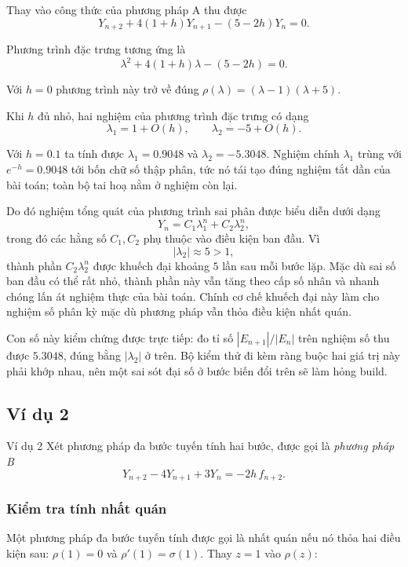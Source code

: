 Thay vào công thức của phương pháp A thu được
\[
Y_{n+2}+4(1+h)Y_{n+1}-(5-2h)Y_n=0.
\]

Phương trình đặc trưng tương ứng là
\[
\lambda^2+4(1+h)\lambda-(5-2h)=0.
\]

Với $h=0$ phương trình này trở về đúng $\rho(\lambda)=(\lambda-1)(\lambda+5)$.

Khi $h$ đủ nhỏ, hai nghiệm của phương trình đặc trưng có dạng
\[
\lambda_1=1+O(h),\qquad
\lambda_2=-5+O(h).
\]

Với $h=0.1$ ta tính được $\lambda_1=0.9048$ và $\lambda_2=-5.3048$. Nghiệm chính
$\lambda_1$ trùng với $e^{-h}=0.9048$ tới bốn chữ số thập phân, tức nó tái tạo đúng
nghiệm tắt dần của bài toán; toàn bộ tai hoạ nằm ở nghiệm còn lại.

Do đó nghiệm tổng quát của phương trình sai phân được biểu diễn dưới dạng
\[
Y_n=C_1\lambda_1^n+C_2\lambda_2^n,
\]
trong đó các hằng số $C_1,C_2$ phụ thuộc vào điều kiện ban đầu. Vì
\[
|\lambda_2|\approx5>1,
\]
thành phần $C_2\lambda_2^n$ được khuếch đại khoảng $5$ lần sau mỗi bước lặp. Mặc dù sai số ban đầu có thể rất nhỏ, thành phần này vẫn tăng theo cấp số nhân và nhanh chóng lấn át nghiệm thực của bài toán. Chính cơ chế khuếch đại này làm cho nghiệm số phân kỳ mặc dù phương pháp vẫn thỏa điều kiện nhất quán.

Con số này kiểm chứng được trực tiếp: đo tỉ số $|E_{n+1}|/|E_n|$ trên nghiệm số thu
được $5.3048$, đúng bằng $|\lambda_2|$ ở trên. Bộ kiểm thử đi kèm ràng buộc hai giá
trị này phải khớp nhau, nên một sai sót đại số ở bước biến đổi trên sẽ làm hỏng build.

\subsection{Ví dụ 2}
\begin{vidu}{Ví dụ 2}
    Xét phương pháp đa bước tuyến tính hai bước, được gọi là \emph{phương pháp B}
    \begin{equation*}
        Y_{n+2}-4Y_{n+1}+3Y_n=-2h\,f_{n+2}.
    \end{equation*}
\end{vidu}


\subsubsection*{Kiểm tra tính nhất quán}

Một phương pháp đa bước tuyến tính được gọi là nhất quán nếu nó thỏa hai điều kiện sau: $\rho(1) = 0$ và $\rho'(1) = \sigma(1)$. Thay $z = 1$ vào $\rho(z)$:

